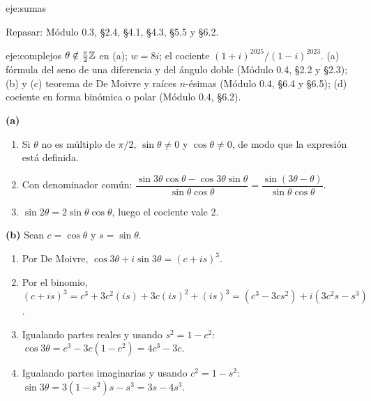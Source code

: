 \begin{solucion}{eje:sumas}

\noindent Repasar: Módulo 0.3, §2.4, §4.1, §4.3, §5.5 y §6.2.
\end{solucion}

\begin{solucion}{eje:complejos}
\datos $\theta\notin\frac{\pi}{2}\mathbb{Z}$ en (a); $w=8i$; el cociente $(1+i)^{2025}/(1-i)^{2023}$.
\planteamiento (a) fórmula del seno de una diferencia y del ángulo doble (Módulo 0.4, §2.2 y §2.3); (b) y (c) teorema de De Moivre y raíces $n$-ésimas (Módulo 0.4, §6.4 y §6.5); (d) cociente en forma binómica o polar (Módulo 0.4, §6.2).
\pasos

\noindent\textbf{(a)}
\begin{enumerate}[label=\arabic*.]
  \item Si $\theta$ no es múltiplo de $\pi/2$, $\sin\theta\neq0$ y $\cos\theta\neq0$, de modo que la expresión está definida.
  \item Con denominador común: $\dfrac{\sin3\theta\cos\theta-\cos3\theta\sin\theta}{\sin\theta\cos\theta}=\dfrac{\sin(3\theta-\theta)}{\sin\theta\cos\theta}$.
  \item $\sin2\theta=2\sin\theta\cos\theta$, luego el cociente vale $2$.
\end{enumerate}

\noindent\textbf{(b)} Sean $c=\cos\theta$ y $s=\sin\theta$.
\begin{enumerate}[label=\arabic*.]
  \item Por De Moivre, $\cos3\theta+i\sin3\theta=(c+is)^{3}$.
  \item Por el binomio, $(c+is)^{3}=c^{3}+3c^{2}(is)+3c(is)^{2}+(is)^{3}=(c^{3}-3cs^{2})+i(3c^{2}s-s^{3})$.
  \item Igualando partes reales y usando $s^{2}=1-c^{2}$: $\cos3\theta=c^{3}-3c(1-c^{2})=4c^{3}-3c$.
  \item Igualando partes imaginarias y usando $c^{2}=1-s^{2}$: $\sin3\theta=3(1-s^{2})s-s^{3}=3s-4s^{3}$.
\end{enumerate}


\end{solucion}
